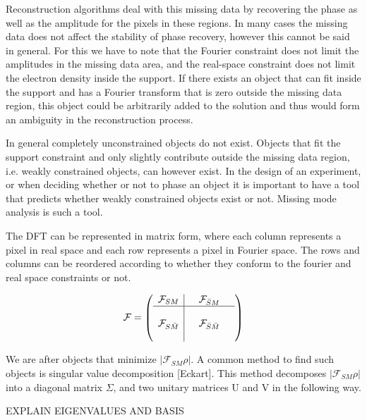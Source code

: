 Reconstruction algorithms deal with this missing data by recovering the phase as well as the amplitude for the pixels in these regions. In many cases the missing data does not affect the stability of phase recovery, however this cannot be said in general. For this we have to note that the Fourier constraint does not limit the amplitudes in the missing data area, and the real-space constraint does not limit the electron density inside the support. If there exists an object that can fit inside the support and has a Fourier transform that is zero outside the missing data region, this object could be arbitrarily added to the solution and thus would form an ambiguity in the reconstruction process.

In general completely unconstrained objects do not exist. Objects that fit the support constraint and only slightly contribute outside the missing data region, i.e. weakly constrained objects, can however exist. In the design of an experiment, or when deciding whether or not to phase an object it is important to have a tool that predicts whether weakly constrained objects exist or not. Missing mode analysis is such a tool.

The DFT can be represented in matrix form, where each column represents a pixel in real space and each row represents a pixel in Fourier space. The rows and columns can be reordered according to whether they conform to the fourier and real space constraints or not.

\begin{equation}\label{equ:F_split}
  \mathcal{F} = 
  \left(\begin{array}{l|lll}
    \mathcal{F}_{SM} & &\mathcal{F}_{\bar{S}M}& \\\hline
    &&&\\
    \mathcal{F}_{S\bar{M}} & & \mathcal{F}_{\bar{S}\bar{M}} &\\
    &&&
  \end{array}\right)
\end{equation}

We are after objects that minimize $|\mathcal{F}_{SM}\rho|$. A common method to find such objects is singular value decomposition [Eckart]. This method decomposes $|\mathcal{F}_{SM}\rho|$ into a diagonal matrix $\Sigma$, and two unitary matrices U and V in the following way.

EXPLAIN EIGENVALUES AND BASIS




